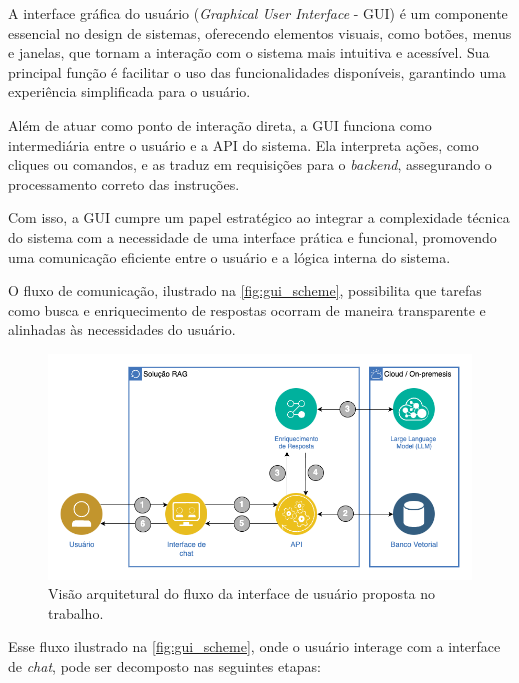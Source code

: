 \documentclass[a4paper, 12pt]{article}
\begin{document}
    A interface gráfica do usuário (\textit{Graphical User Interface} - GUI) é um componente essencial no design de sistemas, oferecendo elementos visuais, como botões, menus e janelas, que tornam a interação com o sistema mais intuitiva e acessível. Sua principal função é facilitar o uso das funcionalidades disponíveis, garantindo uma experiência simplificada para o usuário.

    Além de atuar como ponto de interação direta, a GUI funciona como intermediária entre o usuário e a API do sistema. Ela interpreta ações, como cliques ou comandos, e as traduz em requisições para o \textit{backend}, assegurando o processamento correto das instruções.
    
    Com isso, a GUI cumpre um papel estratégico ao integrar a complexidade técnica do sistema com a necessidade de uma interface prática e funcional, promovendo uma comunicação eficiente entre o usuário e a lógica interna do sistema.

    O fluxo de comunicação, ilustrado na \autoref{fig:gui_scheme}, possibilita que tarefas como busca e enriquecimento de respostas ocorram de maneira transparente e alinhadas às necessidades do usuário.

    \begin{figure}[h!]
        \includegraphics[width=\textwidth,height=0.9\textheight,keepaspectratio]{architecture-solution.png}
        \centering
        \caption{Visão arquitetural do fluxo da interface de usuário proposta no trabalho.}
        \centering
        \label{fig:gui_scheme}
    \end{figure}
    
    Esse fluxo ilustrado na \autoref{fig:gui_scheme}, onde o usuário interage com a interface de \textit{chat}, pode ser decomposto nas seguintes etapas:
\end{document}
